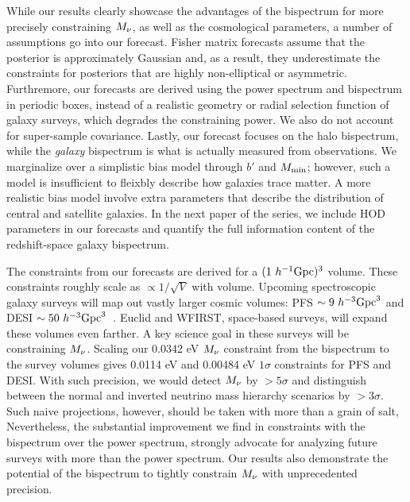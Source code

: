 While our results clearly showcase the advantages of the bispectrum for
more precisely constraining $M_\nu$, as well as the cosmological parameters, 
a number of assumptions go into our forecast. Fisher matrix forecasts assume 
that the posterior is approximately Gaussian and, as a result, they 
underestimate the constraints for posteriors that are highly non-elliptical 
or asymmetric. Furthremore, our forecasts are derived using the power spectrum 
and bispectrum in periodic boxes, instead of a realistic geometry or 
radial selection function of galaxy surveys, which degrades the constraining power. 
We also do not account for super-sample covariance. Lastly, our forecast
focuses on the halo bispectrum, while the \emph{galaxy} bispectrum is what is 
actually measured from observations. We marginalize over a simplistic bias model 
through $b'$ and $M_{\rm min}$; however, such a model is insufficient to 
fleixbly describe how galaxies trace matter. A more realistic bias model 
involve extra parameters that describe the distribution of central and satellite 
galaxies. In the next paper of the series, we include HOD parameters in our
forecasts and quantify the full information content of the redshift-space 
galaxy bispectrum. 

The constraints from our forecasts are derived for a $(1~h^{-1}{\rm Gpc})^3$ 
volume. These constraints roughly scale as $\propto1/\sqrt{V}$ with volume. 
Upcoming spectroscopic galaxy surveys will map out vastly larger cosmic
volumes: PFS $\sim 9~h^{-3}{\rm Gpc}^3$ and DESI $\sim 50~h^{-3}{\rm Gpc}^3$~\citep{takada2014, desicollaboration2016}. 
Euclid and WFIRST, space-based surveys, will expand these volumes even 
farther. A key science goal in these surveys will be constraining $M_\nu$. 
Scaling our 0.0342 eV $M_\nu$ constraint from the bispectrum to the survey 
volumes gives 0.0114 eV and 0.00484 eV $1\sigma$ constraints for PFS 
and DESI. With such precision, we would detect $M_\nu$ by $>5\sigma$ and 
distinguish between the normal and inverted neutrino mass hierarchy scenarios 
by $>3\sigma$. Such naive projections, however, should be taken with more than 
a grain of salt, Nevertheless, the substantial improvement we find in 
constraints with the bispectrum over the power spectrum, strongly advocate for 
analyzing future surveys with more than the power spectrum. Our results also 
demonstrate the potential of the bispectrum to tightly constrain $M_\nu$ with 
unprecedented precision.
